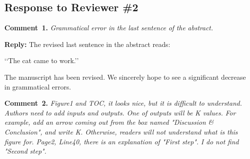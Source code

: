 \documentclass{WileyMSP-template}
\begin{document}







\vspace{1cm}
\subsection*{Response to Reviewer \#2 }


\noindent
\textcolor[rgb]{0.00,0.50,1.00}{\textbf{Comment~1.}}
\emph{Grammatical error in the last sentence of the abstract.}


\noindent
\textcolor[rgb]{0.51,0.00,0.00}{\textbf{Reply:}}
The revised last sentence in the abstract reads:

‘‘The cat came to work.’’

The manuscript has been revised.
We sincerely hope to see a significant decrease in grammatical errors.



\vspace{1cm}
\noindent
\textcolor[rgb]{0.00,0.50,1.00}{\textbf{Comment~2.}}
\emph{Figure1 and TOC, it looks nice, but it is difficult to understand.
Authors need to add inputs and outputs.
One of outputs will be K values.
For example, add an arrow coming out from the box named "Discussion \& Conclusion",
and write K.
Otherwise, readers will not understand what is this figure for.
Page2, Line40, there is an explanation of "First step".
I do not find "Second step".}
\end{document}
